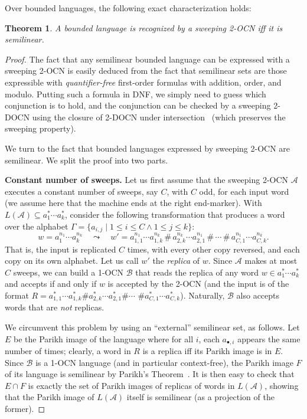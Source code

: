 \documentclass[11pt,a4paper]{amsart}
\newtheorem{theorem}{Theorem}
\theoremstyle{definition}
\newcommand{\cA}{\mathcal{A}}
\newcommand{\cB}{\mathcal{B}}
\newcommand{\mysubparagraph}[1]{\noindent \textbf{\textsf{#1}} }
\begin{document}
Over bounded languages, the following exact characterization holds:
\begin{theorem}
	\label{thm:bounded_sweeping_equiv_semilinear} A bounded language is recognized by a sweeping
	2-OCN iff it is semilinear.
\end{theorem}
\begin{proof}
	The fact that any semilinear bounded language can be expressed with a sweeping
	2-OCN is easily deduced from the fact that semilinear sets are those
	expressible with \emph{quantifier-free} first-order formulas with addition,
	order, and modulo.  Putting such a formula in DNF, we simply need to guess
	which conjunction is to hold, and the conjunction can be checked by a sweeping
	2-DOCN using the closure of 2-DOCN under intersection~\cite{miyano1982two} (which preserves the sweeping property).
	
	We turn to the fact that bounded languages expressed by sweeping 2-OCN are
	semilinear.  We split the proof into two parts.
	
	\mysubparagraph{Constant number of sweeps.}  Let us first assume that the
	sweeping 2-OCN \(\cA\) executes a constant number of sweeps, say \(C\), with
	\(C\) odd, for each input word (we assume here that the machine ends at the
	right end-marker).  With \(L(\cA) \subseteq a_1^*\cdots a_k^*\), consider the following
	transformation that produces a word over the alphabet
	\(\Gamma = \{a_{i,j} \mid 1 \leq i \leq C \land 1 \leq j \leq k\}\):
	\[w = a_1^{n_1}\cdots a_k^{n_k} \quad \leadsto \quad w' = a_{1,1}^{n_1}\cdots a_{1,k}^{n_k} \,\#\,
	a_{2,k}^{n_k}\cdots a_{2,1}^{n_1} \,\#\, \cdots \,\#\, a_{C,1}^{n_1}\cdots
	a_{C,k}^{n_k}.\]%
	That is, the input is replicated \(C\) times, with every other copy reversed,
	and each copy on its own alphabet.  Let us call \(w'\) the \emph{replica} of
	\(w\).  Since \(\cA\) makes at most \(C\) sweeps, we can build a 1-OCN \(\cB\) that
	reads the replica of any word \(w \in a_1^*\cdots a_k^*\) and accepts if and only if
	\(w\) is accepted by the 2-OCN (and the input is of the format \(R =
	a_{1,1}^*\cdots a_{1,k}^*\#a_{2,k}^*\cdots a_{2,1}^*\#\cdots\) \(\# a_{C,1}^*\cdots a_{C,k}^*\)). 
	Naturally, \(\cB\) also accepts words that are
	\emph{not} replicas. 
	
	We circumvent this problem by using an ``external'' semilinear set, as follows. Let
	\(E\) be the Parikh image of the language where for all \(i\), each \(a_{\bullet,i}\)
	appears the same number of times; clearly, a word in \(R\) is a replica iff its
	Parikh image is in \(E\).  Since \(\cB\) is a 1-OCN language (and in particular context-free), the Parikh image \(F\)
	of its language is semilinear by Parikh's Theorem~\cite{parikh66}.  
	It is then easy to check that \(E \cap F\) is exactly
	the set of Parikh images of replicas of words in \(L(\cA)\), showing that the
	Parikh image of \(L(\cA)\) itself is semilinear (as a projection of the former).
	

\end{proof}
\end{document}

